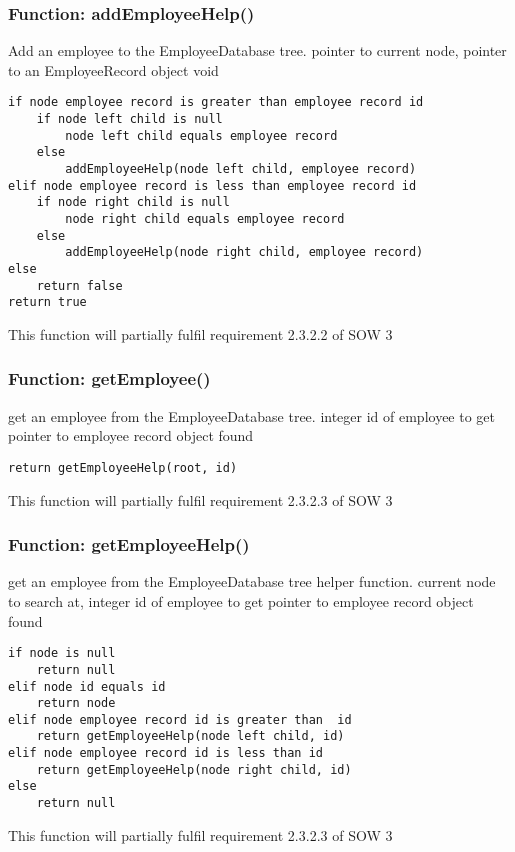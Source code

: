 \documentclass[12pt]{article}%
\newcounter{subsubsubsection}[subsubsection]
\begin{document}
\subsubsection{Function: addEmployeeHelp()}
Add an employee to the EmployeeDatabase tree.
pointer to current node, pointer to an EmployeeRecord object
void
\begin{verbatim}
if node employee record is greater than employee record id
    if node left child is null
        node left child equals employee record
    else
        addEmployeeHelp(node left child, employee record)
elif node employee record is less than employee record id
    if node right child is null
        node right child equals employee record
    else
        addEmployeeHelp(node right child, employee record)
else
    return false
return true
\end{verbatim}
This function will partially fulfil requirement 2.3.2.2 of SOW 3

\subsubsection{Function: getEmployee()}
get an employee from the EmployeeDatabase tree.
integer id of employee to get
pointer to employee record object found
\begin{verbatim}
return getEmployeeHelp(root, id)
\end{verbatim}
This function will partially fulfil requirement 2.3.2.3 of SOW 3

\subsubsection{Function: getEmployeeHelp()}
get an employee from the EmployeeDatabase tree helper function.
current node to search at, integer id of employee to get
pointer to employee record object found
\begin{verbatim}
if node is null
    return null
elif node id equals id
    return node
elif node employee record id is greater than  id
    return getEmployeeHelp(node left child, id)
elif node employee record id is less than id
    return getEmployeeHelp(node right child, id)
else
    return null
\end{verbatim}
This function will partially fulfil requirement 2.3.2.3 of SOW 3
\end{document}

